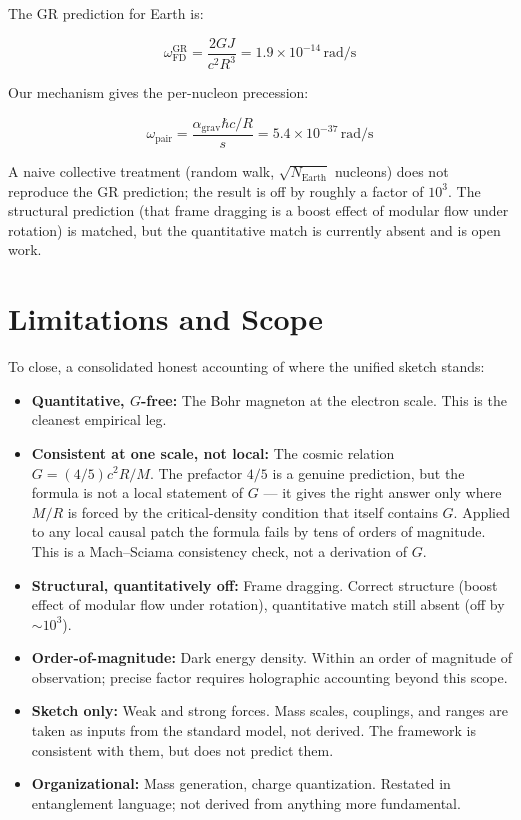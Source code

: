 \documentclass[11pt,letterpaper]{article}
\begin{document}
The GR prediction for Earth is:

\begin{equation}
  \omega_{\mathrm{FD}}^{\mathrm{GR}} = \frac{2GJ}{c^2 R^3}
  = 1.9 \times 10^{-14}\,\mathrm{rad/s}
  \label{eq:frame_dragging_gr}
\end{equation}

Our mechanism gives the per-nucleon precession:

\begin{equation}
  \omega_{\mathrm{pair}} = \frac{\alpha_{\mathrm{grav}} \hbar c / R}{s}
  = 5.4 \times 10^{-37}\,\mathrm{rad/s}
  \label{eq:frame_dragging_pair}
\end{equation}

A naive collective treatment (random walk, $\sqrt{N_{\mathrm{Earth}}}$
nucleons) does not reproduce the GR prediction; the result is off by
roughly a factor of $10^3$. The structural prediction (that frame
dragging is a boost effect of modular flow under rotation) is matched,
but the quantitative match is currently absent and is open work.

\section{Limitations and Scope}

To close, a consolidated honest accounting of where the unified
sketch stands:

\begin{itemize}
  \item \textbf{Quantitative, $G$-free:} The Bohr magneton at the
    electron scale. This is the cleanest empirical leg.
  \item \textbf{Consistent at one scale, not local:} The cosmic
    relation $G = (4/5) c^2 R/M$. The prefactor $4/5$ is a genuine
    prediction, but the formula is not a local statement of $G$ ---
    it gives the right answer only where $M/R$ is forced by the
    critical-density condition that itself contains $G$. Applied to
    any local causal patch the formula fails by tens of orders of
    magnitude. This is a Mach--Sciama consistency check, not a
    derivation of $G$.
  \item \textbf{Structural, quantitatively off:} Frame dragging.
    Correct structure (boost effect of modular flow under rotation),
    quantitative match still absent (off by $\sim 10^3$).
  \item \textbf{Order-of-magnitude:} Dark energy density. Within an
    order of magnitude of observation; precise factor requires
    holographic accounting beyond this scope.
  \item \textbf{Sketch only:} Weak and strong forces. Mass scales,
    couplings, and ranges are taken as inputs from the standard
    model, not derived. The framework is consistent with them, but
    does not predict them.
  \item \textbf{Organizational:} Mass generation, charge
    quantization. Restated in entanglement language; not derived
    from anything more fundamental.
\end{itemize}
\end{document}
